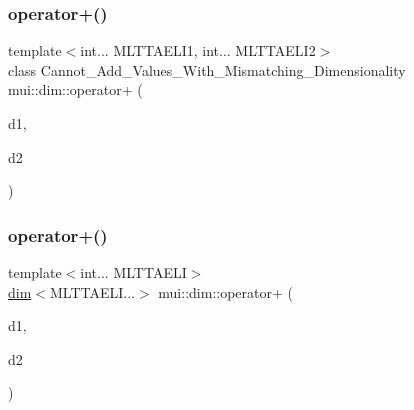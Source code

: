 \subsubsection{\texorpdfstring{operator+()}{operator+()}\hspace{0.1cm}{\footnotesize\ttfamily [1/2]}}
{\footnotesize\ttfamily template$<$int... M\+L\+T\+T\+A\+E\+L\+I1, int... M\+L\+T\+T\+A\+E\+L\+I2$>$ \\
class Cannot\+\_\+\+Add\+\_\+\+Values\+\_\+\+With\+\_\+\+Mismatching\+\_\+\+Dimensionality mui\+::dim\+::operator+ (\begin{DoxyParamCaption}\item[{const \hyperlink{structmui_1_1dim_1_1dim}{dim}$<$ M\+L\+T\+T\+A\+E\+L\+I1... $>$ \&}]{d1,  }\item[{const \hyperlink{structmui_1_1dim_1_1dim}{dim}$<$ M\+L\+T\+T\+A\+E\+L\+I2... $>$ \&}]{d2 }\end{DoxyParamCaption})\hspace{0.3cm}{\ttfamily [inline]}}

\mbox{\label{namespacemui_1_1dim_ae596cbebd6adc9e7bf6f67055a1515ea}} 
\subsubsection{\texorpdfstring{operator+()}{operator+()}\hspace{0.1cm}{\footnotesize\ttfamily [2/2]}}
{\footnotesize\ttfamily template$<$int... M\+L\+T\+T\+A\+E\+LI$>$ \\
\hyperlink{structmui_1_1dim_1_1dim}{dim}$<$M\+L\+T\+T\+A\+E\+L\+I...$>$ mui\+::dim\+::operator+ (\begin{DoxyParamCaption}\item[{const \hyperlink{structmui_1_1dim_1_1dim}{dim}$<$ M\+L\+T\+T\+A\+E\+L\+I... $>$ \&}]{d1,  }\item[{const \hyperlink{structmui_1_1dim_1_1dim}{dim}$<$ M\+L\+T\+T\+A\+E\+L\+I... $>$ \&}]{d2 }\end{DoxyParamCaption})\hspace{0.3cm}{\ttfamily [inline]}}

\mbox{\label{namespacemui_1_1dim_aecf5041eca941689d71d01af8fa7c6a3}} 
